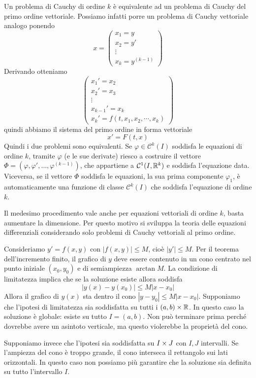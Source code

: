 \documentclass[a4paper]{article}
\begin{document}
\begin{radioactive}
Un problema di Cauchy di ordine \(k\) è equivalente ad un problema di Cauchy del primo ordine vettoriale.
Possiamo infatti porre un problema di Cauchy vettoriale analogo ponendo
\[
    x =
    \begin{pmatrix}
        x_1 = y \\
        x_2 = y' \\
        \vdots \\
        x_k = y^{(k-1)}
    \end{pmatrix}
\]
Derivando otteniamo
\[
    \begin{pmatrix}
        x_1' = x_2 \\
        x_2' = x_3 \\
        \vdots \\
        x_{k-1}' = x_k \\
        x_k' = f(t,x_1, x_2, \cdots, x_k)
    \end{pmatrix}
\]
quindi abbiamo il sistema del primo ordine in forma vettoriale
\[
    x' = F(t,x)
\]
Quindi i due problemi sono equivalenti.
Se \(\varphi \in \mathcal C^k(I)\) soddisfa le equazioni di ordine \(k\),
tramite \(\varphi\) (e le sue derivate) riesco a
costruire il vettore \(\Phi = (\varphi, \varphi', \ldots, \varphi^{(k-1)})\), che appartiene a \(\mathcal C^1(I, \mathbb{R}^k)\) e soddisfa l'equazione data.
Viceversa, se il vettore \(\Phi\) soddisfa le equazioni,
la sua prima componente \(\varphi_1\), è automaticamente una funzione di classe \(\mathcal C^k(I)\) che soddisfa l'equazione
di ordine \(k\).

Il medesimo procedimento vale anche per equazioni vettoriali di ordine \(k\),
basta aumentare la dimensione.
Per questo motivo si sviluppa la teoria delle equazioni differenziali considerando solo
problemi di Cauchy vettoriali al primo ordine.
\end{radioactive}

\begin{radioactive}
Consideriamo \(y' = f(x,y)\) con \(|f(x,y)| \leq M\),
cioè \(|y'| \leq M\).
Per il teorema dell'incremento finito, il grafico di \(y\) deve essere contenuto in un cono
centrato nel punto iniziale \((x_0, y_0)\) e di semiampiezza \(\arctan M\).
La condizione di limitatezza implica che se la soluzione esiste allora soddisfa \[
    |y(x) - y(x_0)| \leq M|x-x_0|
\]
Allora il grafico di \(y(x)\) sta dentro il cono \(|y-y_0| \leq M|x-x_0|\).
Supponiamo che l'ipotesi di limitatezza sia soddisfatta su tutti i \((a,b) \times \mathbb{R}\).
In questo caso la soluzione è globale: esiste su tutto \(I=(a,b)\).
Non può terminare prima perché dovrebbe avere un asintoto verticale,
ma questo violerebbe la proprietà del cono.

Supponiamo invece che l'ipotesi sia soddisfatta su \(I \times J\) con \(I, J\) intervalli.
Se l'ampiezza del cono è troppo grande, il cono interseca il rettangolo sui lati orizzontali.
In questo caso non possiamo più garantire che la soluzione sia definita su tutto l'intervallo \(I\).
\end{radioactive}
\end{document}
